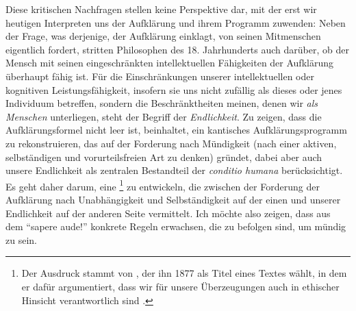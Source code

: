 Diese kritischen Nachfragen stellen keine Perspektive dar, mit der erst wir heutigen Interpreten
uns der Aufklärung und ihrem Programm zuwenden: Neben der Frage, was derjenige,
der Aufklärung einklagt, von seinen Mitmenschen eigentlich fordert, stritten
Philosophen des 18. Jahrhunderts auch darüber, ob der Mensch mit seinen
eingeschränkten intellektuellen Fähigkeiten der Aufklärung überhaupt fähig ist.
Für die Einschränkungen unserer intellektuellen oder kognitiven
Leistungsfähigkeit, insofern sie uns nicht zufällig als dieses oder jenes
Individuum betreffen, sondern die Beschränktheiten meinen, denen wir \emph{als Menschen} unterliegen, steht der Begriff der \emph{Endlichkeit}.
Zu zeigen, dass die Aufklärungsformel nicht leer ist, beinhaltet, ein kantisches
Aufklärungsprogramm zu rekonstruieren, das auf der Forderung nach Mündigkeit
(nach einer aktiven, selbständigen und vorurteilsfreien Art zu denken) gründet,
dabei aber auch unsere Endlichkeit als zentralen Bestandteil der
\emph{conditio humana} berücksichtigt. Es geht daher darum, eine
\footnote{Der Ausdruck stammt von
, der ihn 1877 als Titel eines
Textes wählt, in dem er dafür argumentiert, dass wir für unsere Überzeugungen
auch in ethischer Hinsicht verantwortlich sind
\parencite[siehe][\pno~189\,f.]{Clifford:TheEthicsofBelief1877}.} zu entwickeln,
die zwischen der Forderung der Aufklärung nach Unabhängigkeit und
Selbständigkeit auf der einen und unserer Endlichkeit auf der anderen Seite
vermittelt.  Ich möchte also zeigen, dass aus dem \enquote{sapere aude!}
konkrete Regeln erwachsen, die zu befolgen sind, um mündig zu sein.

